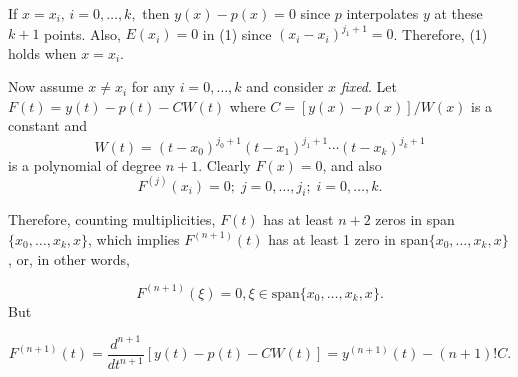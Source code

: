 \documentclass{article}
\begin{document}
\begin{enumerate}
        If $x = x_i,\, i=0,\dots,k,$ then $y(x)-p(x) = 0$ since $p$ interpolates $y$ at these $k+1$ points. Also, $E(x_i) = 0$ in (1) since $(x_i-x_i)^{j_1+1} = 0$. Therefore, (1) holds when $x=x_i$.
        
        Now assume $x \not = x_i$ for any $i = 0,\dots,k$ and consider $x$ \textit{fixed}. Let $F(t) = y(t) - p(t) - CW(t)$ where $C = [y(x) - p(x)]/W(x)$ is a constant and
        \begin{equation}
            W(t) = (t-x_0)^{j_0 +1}(t-x_1)^{j_1+1}\cdots (t-x_k)^{j_k+1}
        \end{equation}
        is a polynomial of degree $n+1$. Clearly $F(x) = 0$, and also
        \begin{equation}
            F^{(j)}(x_i) = 0;\; j=0,\dots,j_i;\; i=0,\dots,k.
        \end{equation}

        Therefore, counting multiplicities, $F(t)$ has at least $n+2$ zeros in span$\{x_0,\dots,x_k,x\}$, which implies $F^{(n+1)}(t)$ has at least 1 zero in span$\{x_0,\dots,x_k,x\}$, or, in other words,

        \begin{equation}
            F^{(n+1)}(\xi) = 0, \xi \in \text{span}\{x_0,\dots,x_k,x\}.
        \end{equation}
        But

        \begin{equation}
            F^{(n+1)}(t) = \frac{d^{n+1}}{dt^{n+1}}[y(t) - p(t) - CW(t)] = y^{(n+1)}(t) - (n+1)!C.
        \end{equation}


\end{enumerate}
\end{document}
